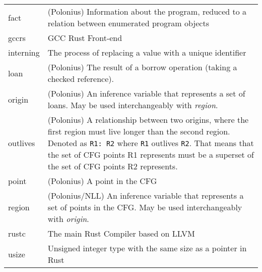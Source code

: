 \documentclass[
  11pt,
  twoside]{report}
\begin{document}
\begin{longtable}[]{@{}
  >{\raggedright\arraybackslash}p{}
  >{\raggedright\arraybackslash}p{}@{}}
fact & (Polonius) Information about the program, reduced to a relation
between enumerated program objects \\
gccrs & GCC Rust Front-end \\
interning & The process of replacing a value with a unique identifier \\
loan & (Polonius) The result of a borrow operation (taking a checked
reference). \\
origin & (Polonius) An inference variable that represents a set of
loans. May be used interchangeably with \emph{region}. \\
outlives & (Polonius) A relationship between two origins, where the
first region must live longer than the second region. Denoted as
\texttt{R1:\ R2} where \texttt{R1} outlives \texttt{R2}. That means that
the set of CFG points R1 represents must be a superset of the set of CFG
points R2 represents. \\
point & (Polonius) A point in the CFG \\
region & (Polonius/NLL) An inference variable that represents a set of
points in the CFG. May be used interchangeably with \emph{origin}. \\
rustc & The main Rust Compiler based on LLVM \\
usize & Unsigned integer type with the same size as a pointer in Rust \\
\end{longtable}
\end{document}
